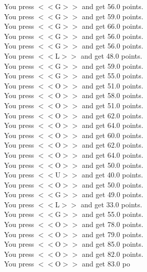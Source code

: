 \documentclass[pdflatex,sn-nature]{sn-jnl}%
\theoremstyle{thmstyleone}%
\theoremstyle{thmstyletwo}%
\theoremstyle{thmstylethree}%
\begin{document}
You press $<<$G$>>$ and get 56.0 points. $~$\\ 
You press $<<$G$>>$ and get 59.0 points. $~$\\ 
You press $<<$G$>>$ and get 66.0 points. $~$\\ 
You press $<<$G$>>$ and get 56.0 points. $~$\\ 
You press $<<$G$>>$ and get 56.0 points. $~$\\ 
You press $<<$L$>>$ and get 48.0 points. $~$\\ 
You press $<<$G$>>$ and get 59.0 points. $~$\\ 
You press $<<$G$>>$ and get 55.0 points. $~$\\ 
You press $<<$O$>>$ and get 51.0 points. $~$\\ 
You press $<<$O$>>$ and get 58.0 points. $~$\\ 
You press $<<$O$>>$ and get 51.0 points. $~$\\ 
You press $<<$O$>>$ and get 62.0 points. $~$\\ 
You press $<<$O$>>$ and get 64.0 points. $~$\\ 
You press $<<$O$>>$ and get 60.0 points. $~$\\ 
You press $<<$O$>>$ and get 62.0 points. $~$\\ 
You press $<<$O$>>$ and get 64.0 points. $~$\\ 
You press $<<$O$>>$ and get 50.0 points. $~$\\ 
You press $<<$U$>>$ and get 40.0 points. $~$\\ 
You press $<<$O$>>$ and get 50.0 points. $~$\\ 
You press $<<$G$>>$ and get 49.0 points. $~$\\ 
You press $<<$L$>>$ and get 33.0 points. $~$\\ 
You press $<<$G$>>$ and get 55.0 points. $~$\\ 
You press $<<$O$>>$ and get 78.0 points. $~$\\ 
You press $<<$O$>>$ and get 79.0 points. $~$\\ 
You press $<<$O$>>$ and get 85.0 points. $~$\\ 
You press $<<$O$>>$ and get 82.0 points. $~$\\ 
You press $<<$O$>>$ and get 83.0 po 
\end{document}
